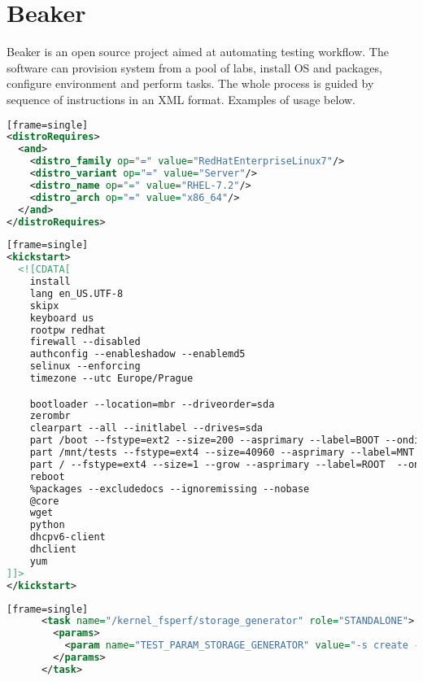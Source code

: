\documentclass[
  color, %
  table, %
  lof,   %
  lot,   %
]{fithesis3}
\begin{document}
\section{Beaker}
Beaker is an open source project aimed at automating testing workflow. The software can provision system from a pool of labs, install OS and packages, configure environment and perform tasks. The whole process is guided by sequence of instructions in an XML format. Examples of usage below.




\begin{lstlisting}[language=xml, caption={Specifying OS to be installed}][frame=single]
<distroRequires>
  <and>
    <distro_family op="=" value="RedHatEnterpriseLinux7"/>
    <distro_variant op="=" value="Server"/>
    <distro_name op="=" value="RHEL-7.2"/>
    <distro_arch op="=" value="x86_64"/>
  </and>
</distroRequires>
\end{lstlisting}

\begin{lstlisting}[language=xml, caption={Configuring environment using kickstart}][frame=single]
<kickstart>
  <![CDATA[
    install
    lang en_US.UTF-8
    skipx
    keyboard us
    rootpw redhat
    firewall --disabled
    authconfig --enableshadow --enablemd5
    selinux --enforcing
    timezone --utc Europe/Prague

    bootloader --location=mbr --driveorder=sda
    zerombr
    clearpart --all --initlabel --drives=sda
    part /boot --fstype=ext2 --size=200 --asprimary --label=BOOT --ondisk=sda
    part /mnt/tests --fstype=ext4 --size=40960 --asprimary --label=MNT --ondisk=sda
    part / --fstype=ext4 --size=1 --grow --asprimary --label=ROOT  --ondisk=sda
    reboot
    %packages --excludedocs --ignoremissing --nobase
    @core
    wget
    python
    dhcpv6-client
    dhclient
    yum
]]>
</kickstart>
\end{lstlisting}

\begin{lstlisting}[language=xml, caption={Executing task and passing arguments}][frame=single]
      <task name="/kernel_fsperf/storage_generator" role="STANDALONE">
        <params>
          <param name="TEST_PARAM_STORAGE_GENERATOR" value="-s create -f ext4 -t single -m /RHTSspareLUN1 -d /dev/sdc -T 1SASHDD_ext4"/>
        </params>
      </task>
\end{lstlisting}
\end{document}
